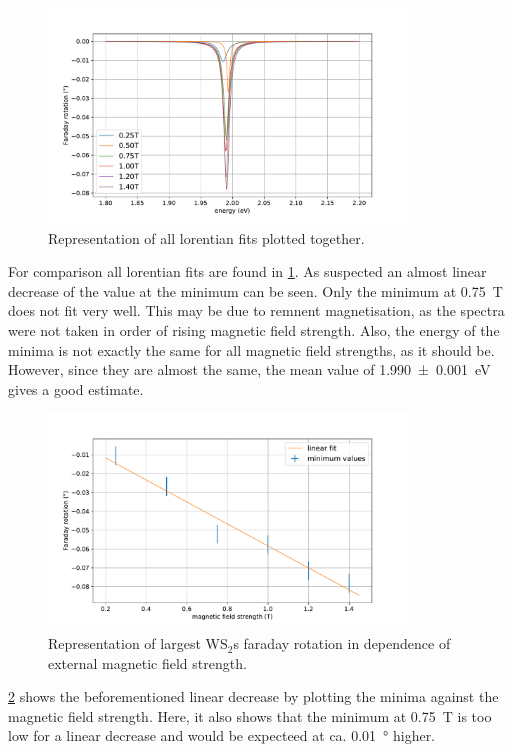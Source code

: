 \begin{figure}[!ht]
    \centering
    \includegraphics[width=0.85\textwidth]{plots/WS2_lorentians.pdf}
    \caption{Representation of all lorentian fits plotted together.}
    \label{fig_WS2_lorentians}
\end{figure}
For comparison all lorentian fits are found in \cref{fig_WS2_lorentians}.
As suspected an almost linear decrease of the value at the minimum can be seen.
Only the minimum at \SI{0.75}{\tesla} does not fit very well.
This may be due to remnent magnetisation, as the spectra were not taken in order of rising magnetic field strength.
Also, the energy of the minima is not exactly the same for all magnetic field strengths, as it should be.
However, since they are almost the same, the mean value of \SI{1.990+-0.001}{\electronvolt} gives a good estimate.

\begin{figure}[!ht]
    \centering
    \includegraphics[width=0.85\textwidth]{plots/WS2_mins.pdf}
    \caption{Representation of largest WS$_2$s faraday rotation in dependence of external magnetic field strength.}
    \label{fig_WS2_minima}
\end{figure}
\cref{fig_WS2_minima} shows the beforementioned linear decrease by plotting the minima against the magnetic field strength.
Here, it also shows that the minimum at \SI{0.75}{\tesla} is too low for a linear decrease and would be expecteed at ca. \SI{0.01}{\degree} higher.

